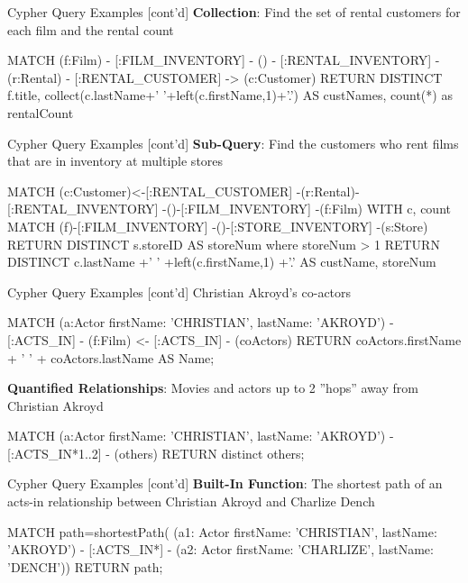 \documentclass[ignorenonframetext,xcolor=x11names]{beamer}
\begin{document}
\begin{frame}[fragile]{Cypher Query Examples \small [cont'd]}
\textbf{Collection}: Find the set of rental customers for each film and the rental count
\footnotesize
\begin{cyphercode}
MATCH (f:Film) - [:FILM_INVENTORY] 
    - () - [:RENTAL_INVENTORY] 
    - (r:Rental) - [:RENTAL_CUSTOMER] 
    -> (c:Customer)
RETURN DISTINCT f.title, 
      collect(c.lastName+' '+left(c.firstName,1)+'.') 
          AS custNames, 
      count(*) as rentalCount
\end{cyphercode}
\end{frame}

\begin{frame}[fragile]{Cypher Query Examples \small [cont'd]}
\textbf{Sub-Query}: Find the customers who rent films that are in inventory at multiple stores
\footnotesize
\begin{cyphercode}
MATCH (c:Customer)<-[:RENTAL_CUSTOMER]
     -(r:Rental)-[:RENTAL_INVENTORY]
     -()-[:FILM_INVENTORY]
     -(f:Film) 
WITH c, count{ 
  MATCH (f)-[:FILM_INVENTORY]
       -()-[:STORE_INVENTORY]
       -(s:Store) 
  RETURN DISTINCT s.storeID
} AS storeNum
where storeNum > 1
RETURN DISTINCT 
  c.lastName
       +' '
       +left(c.firstName,1)
       +'.' AS custName, 
  storeNum
\end{cyphercode}
\end{frame}

\begin{frame}[fragile]{Cypher Query Examples \small [cont'd]}
Christian Akroyd's co-actors
\footnotesize
\begin{cyphercode}
MATCH (a:Actor {firstName: 'CHRISTIAN', 
                lastName: 'AKROYD'}) 
      - [:ACTS_IN] 
      - (f:Film) 
     <- [:ACTS_IN] 
      - (coActors) 
RETURN coActors.firstName + ' ' + 
       coActors.lastName AS Name;
\end{cyphercode}
\normalsize
\textbf{Quantified Relationships}: Movies and actors up to 2 ''hops'' away from Christian Akroyd
\footnotesize
\begin{cyphercode}
MATCH (a:Actor {firstName: 'CHRISTIAN', 
                lastName: 'AKROYD'})
      - [:ACTS_IN*1..2] 
      - (others) 
RETURN distinct others;
\end{cyphercode}
\end{frame}

\begin{frame}[fragile]{Cypher Query Examples \small [cont'd]}
\textbf{Built-In Function}: The shortest path of an acts-in relationship between Christian Akroyd and Charlize Dench
\footnotesize
\begin{cyphercode}
MATCH path=shortestPath( 
  (a1: Actor {firstName: 'CHRISTIAN', 
              lastName: 'AKROYD'}) 
  - [:ACTS_IN*] 
  - (a2: Actor {firstName: 'CHARLIZE', 
                lastName: 'DENCH'})) 
RETURN path;
\end{cyphercode}
\end{frame}
\end{document}
